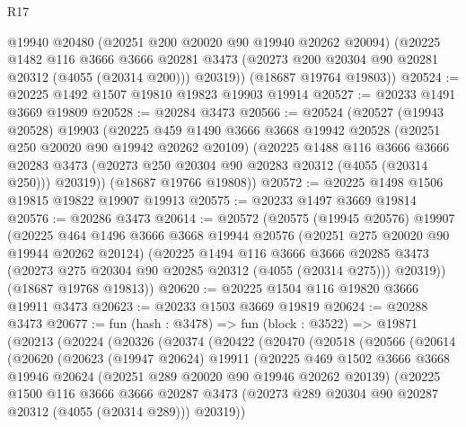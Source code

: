 \begin{lexlean}{R17}
\begin{coremodule}
        @19940
        @20480
        (@20251 @200 @20020 @90 @19940 @20262 @20094)
        (@20225
          @1482
          @116
          @3666
          @3666
          @20281
          @3473
          (@20273 @200 @20304 @90 @20281 @20312 (@4055 (@20314 @200)))
          @20319))
      (@18687 @19764 @19803))
@20524 := @20225 @1492 @1507 @19810 @19823 @19903 @19914
@20527 := @20233 @1491 @3669 @19809
@20528 := @20284 @3473
@20566 := @20524
    (@20527
      (@19943 @20528)
      @19903
      (@20225
        @459
        @1490
        @3666
        @3668
        @19942
        @20528
        (@20251 @250 @20020 @90 @19942 @20262 @20109)
        (@20225
          @1488
          @116
          @3666
          @3666
          @20283
          @3473
          (@20273 @250 @20304 @90 @20283 @20312 (@4055 (@20314 @250)))
          @20319))
      (@18687 @19766 @19808))
@20572 := @20225 @1498 @1506 @19815 @19822 @19907 @19913
@20575 := @20233 @1497 @3669 @19814
@20576 := @20286 @3473
@20614 := @20572
    (@20575
      (@19945 @20576)
      @19907
      (@20225
        @464
        @1496
        @3666
        @3668
        @19944
        @20576
        (@20251 @275 @20020 @90 @19944 @20262 @20124)
        (@20225
          @1494
          @116
          @3666
          @3666
          @20285
          @3473
          (@20273 @275 @20304 @90 @20285 @20312 (@4055 (@20314 @275)))
          @20319))
      (@18687 @19768 @19813))
@20620 := @20225 @1504 @116 @19820 @3666 @19911 @3473
@20623 := @20233 @1503 @3669 @19819
@20624 := @20288 @3473
@20677 := fun (hash : @3478) =>
  fun (block : @3522) =>
  @19871
    (@20213
      (@20224
        (@20326
          (@20374
            (@20422
              (@20470
                (@20518
                  (@20566
                    (@20614
                      (@20620
                        (@20623
                          (@19947 @20624)
                          @19911
                          (@20225
                            @469
                            @1502
                            @3666
                            @3668
                            @19946
                            @20624
                            (@20251 @289 @20020 @90 @19946 @20262 @20139)
                            (@20225
                              @1500
                              @116
                              @3666
                              @3666
                              @20287
                              @3473
                              (@20273 @289 @20304 @90 @20287 @20312 (@4055 (@20314 @289)))
                              @20319))

\end{coremodule}
\end{lexlean}
